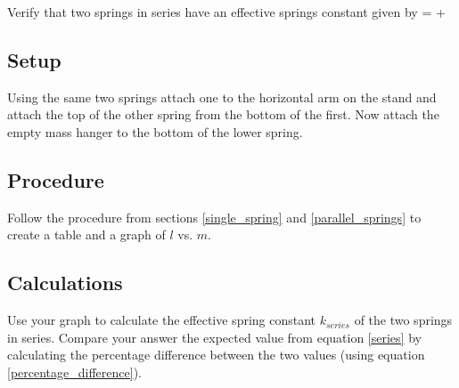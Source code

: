         Verify that two springs in series have an effective springs constant given by
        \beq \label{series}
             =  + 
        \eeq

    \subsection*{Setup}

        Using the same two springs attach one to the horizontal arm on the stand and attach the top of the other spring from the bottom of the first. Now attach the empty mass hanger to the bottom of the lower spring.

    \subsection*{Procedure}

        Follow the procedure from sections \ref{single_spring} and \ref{parallel_springs} to create a table and a graph of $l$ vs. $m$.

    \subsection*{Calculations}

        Use your graph to calculate the effective spring constant $k_{series}$ of the two springs in series. Compare your answer the expected value from equation \eqref{series} by calculating the percentage difference between the two values (using equation \eqref{percentage_difference}).
